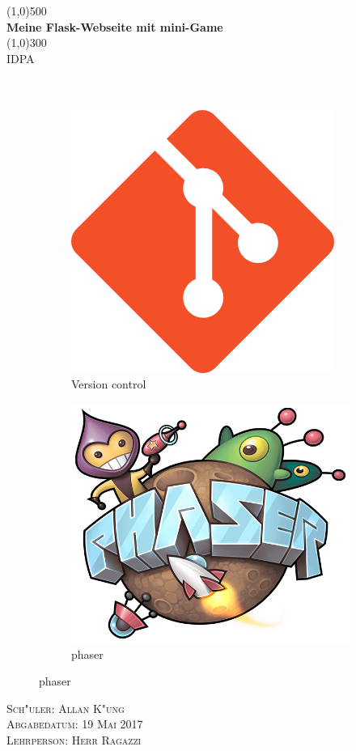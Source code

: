 \documentclass{article}
\begin{document}
\begin{titlepage}
    \begin{center}
    \line(1,0){500} \\ %
    [3mm]%
    \huge{\bfseries Meine Flask-Webseite mit mini-Game} \\
    [2mm]%
    \line(1,0){300} \\ %
    [1.5cm]%
    \textsc{\LARGE IDPA} \\
    [0.75cm]
     \\
    \\
\vspace{2cm}
    \begin{figure}[ht]
    \centering
    \begin{subfigure}{.5\textwidth}
      \centering
      \includegraphics[width=.5\linewidth]{git_logo}
      \caption{Version control}
      \label{fig:sub1}
    \end{subfigure}%
    \begin{subfigure}{.5\textwidth}
      \centering
      \includegraphics[width=.5\linewidth]{phaser}
      \caption{phaser}
      \label{fig:sub2}
    \end{subfigure}
    \end{figure}
    \vspace{3cm}
    \end{center}
    \begin{flushright}
    \textsc{
    \large Sch"uler: Allan K"ung\\
    Abgabedatum: 19 Mai 2017 \\
    Lehrperson: Herr Ragazzi\\
    }
    \end{flushright}
\end{titlepage}
\end{document}
